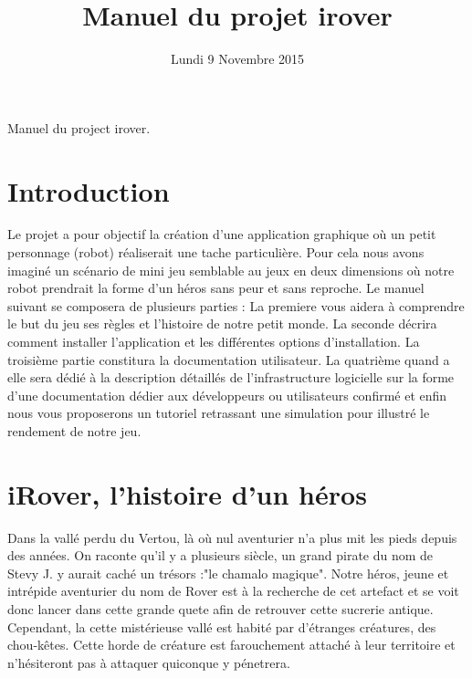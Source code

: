\documentclass[a4paper 12pts]{article}
\title{Manuel du projet irover}
\date{Lundi 9 Novembre 2015}
\author{}
\begin{document}
\maketitle

Manuel du project irover.


\newpage

\tableofcontents

\section{Introduction}



Le projet a pour objectif la création d'une application graphique où un petit personnage (robot) réaliserait une tache particulière.
Pour cela nous avons imaginé un scénario de mini jeu semblable au jeux en deux dimensions où notre robot prendrait la forme d'un héros sans peur et sans reproche.
Le manuel suivant se composera de plusieurs parties :
La premiere vous aidera à comprendre le but du jeu ses règles et l'histoire de notre petit monde.
La seconde décrira comment installer l'application et les différentes options d'installation.
La troisième partie constitura la documentation utilisateur.
La quatrième quand a elle sera dédié à la description détaillés de l'infrastructure logicielle sur la forme d'une documentation dédier aux développeurs ou utilisateurs confirmé et enfin nous vous proposerons un tutoriel retrassant une simulation pour illustré le rendement de notre jeu.


\section{iRover, l'histoire d'un héros}



Dans la vallé perdu du Vertou, là où nul aventurier n'a plus mit les pieds depuis des années. On raconte qu'il y a 
plusieurs siècle, un grand pirate du nom de Stevy J. y aurait caché un trésors :"le chamalo magique".
Notre héros, jeune et intrépide aventurier du nom de Rover est à la recherche de cet artefact et se voit donc lancer 
dans cette grande quete afin de retrouver cette sucrerie antique.
Cependant, la cette mistérieuse vallé est habité par d'étranges créatures, des chou-kêtes. 
Cette horde de créature est farouchement attaché à leur territoire et n'hésiteront pas à attaquer quiconque y pénetrera.
\end{document}

